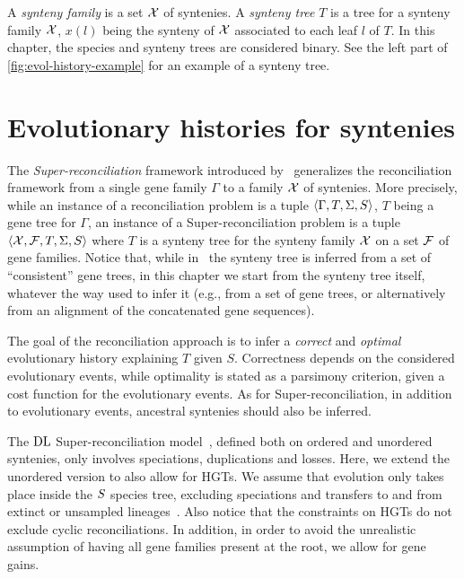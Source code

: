A \emph{synteny family} is a set \(\mathcal{X}\) of syntenies.
A \emph{synteny tree} \(T\) is a tree for a synteny family \(\mathcal{X}\), \(x(l)\)
being the synteny of \(\mathcal{X}\) associated to each leaf \(l\) of \(T\).
In this chapter, the species and synteny trees are considered binary.
See the left part of \cref{fig:evol-history-example} for an example of a synteny tree.

\section{Evolutionary histories for syntenies}\label{sec:superdtl:evol-his}

The \emph{Super-reconciliation} framework introduced by~\textcite{Delabre2020EvolutionSegmentalDuplications} generalizes the reconciliation framework from a single gene family \(\Gamma\) to a family \(\mathcal{X}\) of syntenies.
More precisely, while an instance of a reconciliation problem is a tuple \(\left\langle\Gamma, T, \Sigma, S\right\rangle\), \(T\) being a gene tree for \(\Gamma\), an instance of a Super-reconciliation problem is a tuple \(\left\langle\mathcal{X}, \mathcal{F}, T , \Sigma, S\right\rangle\) where \(T\) is a synteny tree for the synteny family \(\mathcal{X}\) on a set \(\mathcal{F}\) of gene families.
Notice that, while in~\textcite{Delabre2020EvolutionSegmentalDuplications} the synteny tree is inferred from a set of \enquote{consistent} gene trees, in this chapter we start from the synteny tree itself, whatever the way used to infer it (e.g., from a set of gene trees, or alternatively from an alignment of the concatenated gene sequences).

The goal of the reconciliation approach is to infer a \emph{correct} and \emph{optimal} evolutionary history explaining \(T\) given \(S\).
Correctness depends on the considered evolutionary events, while optimality is stated as a parsimony criterion, given a cost function for the evolutionary events.
As for Super-reconciliation, in addition to evolutionary events, ancestral syntenies should also be inferred.

The \(\mathrm{DL}\) Super-reconciliation model~\parencite{Delabre2020EvolutionSegmentalDuplications}, defined both on ordered and unordered syntenies, only involves speciations, duplications and losses. 
Here, we extend the unordered version to also allow for HGTs.
We assume that evolution only takes place inside the \(S\) species tree, excluding speciations and transfers to and from extinct or unsampled lineages~\parencite{Szoelloesi2013LateralGeneTransfer,Weiner2021ImprovedDuplicationTransfer}.
Also notice that the constraints on HGTs do not exclude cyclic reconciliations.
In addition, in order to avoid the unrealistic assumption of having all gene families present at the root, we allow for gene gains.


